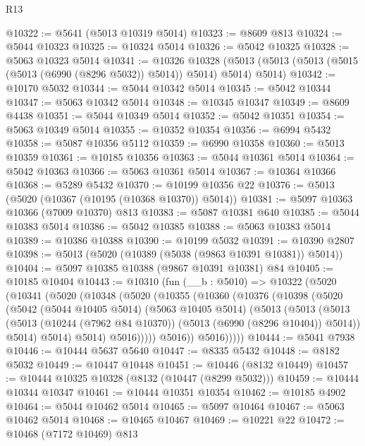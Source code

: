 \begin{lexlean}{R13}
\begin{coremodule}
@10322 := @5641 (@5013 @10319 @5014)
@10323 := @8609 @813
@10324 := @5044 @10323
@10325 := @10324 @5014
@10326 := @5042 @10325
@10328 := @5063 @10323 @5014
@10341 := @10326
    @10328
    (@5013 (@5013 (@5013 (@5015 (@5013 (@6990 (@8296 @5032)) @5014)) @5014) @5014) @5014)
@10342 := @10170 @5032
@10344 := @5044 @10342 @5014
@10345 := @5042 @10344
@10347 := @5063 @10342 @5014
@10348 := @10345 @10347
@10349 := @8609 @4438
@10351 := @5044 @10349 @5014
@10352 := @5042 @10351
@10354 := @5063 @10349 @5014
@10355 := @10352 @10354
@10356 := @6994 @5432
@10358 := @5087 @10356 @5112
@10359 := @6990 @10358
@10360 := @5013 @10359
@10361 := @10185 @10356
@10363 := @5044 @10361 @5014
@10364 := @5042 @10363
@10366 := @5063 @10361 @5014
@10367 := @10364 @10366
@10368 := @5289 @5432
@10370 := @10199 @10356 @22
@10376 := @5013 (@5020 (@10367 (@10195 (@10368 @10370)) @5014))
@10381 := @5097 @10363 @10366 (@7009 @10370) @813
@10383 := @5087 @10381 @640
@10385 := @5044 @10383 @5014
@10386 := @5042 @10385
@10388 := @5063 @10383 @5014
@10389 := @10386 @10388
@10390 := @10199 @5032
@10391 := @10390 @2807
@10398 := @5013 (@5020 (@10389 (@5038 (@9863 @10391 @10381)) @5014))
@10404 := @5097 @10385 @10388 (@9867 @10391 @10381) @84
@10405 := @10185 @10404
@10443 := @10310
    (fun (__b : @5010) =>
    @10322
      (@5020
        (@10341
          (@5020
            (@10348
              (@5020
                (@10355
                  (@10360
                    (@10376
                      (@10398
                        (@5020
                          (@5042
                            (@5044 @10405 @5014)
                            (@5063 @10405 @5014)
                            (@5013
                              (@5013
                                (@5013
                                  (@5013
                                    (@10244 (@7962 @84 @10370))
                                    (@5013 (@6990 (@8296 @10404)) @5014))
                                  @5014)
                                @5014)
                              @5014)
                            @5016)))))
                  @5016))
              @5016)))))
@10444 := @5041 @7938
@10446 := @10444 @5637 @5640
@10447 := @8335 @5432
@10448 := @8182 @5032
@10449 := @10447 @10448
@10451 := @10446 (@8132 @10449)
@10457 := @10444 @10325 @10328 (@8132 (@10447 (@8299 @5032)))
@10459 := @10444 @10344 @10347
@10461 := @10444 @10351 @10354
@10462 := @10185 @4902
@10464 := @5044 @10462 @5014
@10465 := @5097 @10464
@10467 := @5063 @10462 @5014
@10468 := @10465 @10467
@10469 := @10221 @22
@10472 := @10468 (@7172 @10469) @813

\end{coremodule}
\end{lexlean}
